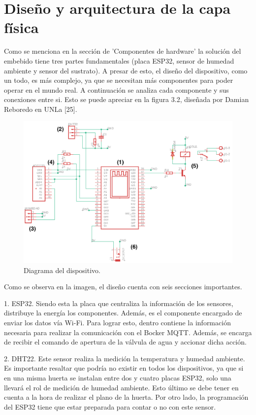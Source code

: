 \section{Diseño y arquitectura de la capa física}
Como se menciona en la sección de 'Componentes de hardware' la solución del embebido tiene tres partes fundamentales (placa ESP32, sensor de humedad ambiente y sensor del sustrato). A presar de esto, el diseño del dispositivo, como un todo, es más complejo, ya que se necesitan más componentes para poder operar en el mundo real. A continuación se analiza cada componente y sus conexiones entre si. Esto se puede apreciar en la figura 3.2, diseñada por Damian Reboredo en UNLa [25].


\begin{figure}[htpb]
\centering 
\includegraphics[width=.9\textwidth]{./Figures/diagDipos.png}
\caption{Diagrama del dispositivo.}
\label{fig:diagBloques}
\end{figure}

Como se observa en la imagen, el diseño cuenta con seis secciones importantes.

1. ESP32. Siendo esta la placa que centraliza la información de los sensores, distribuye la energía los componentes. Además, es el componente encargado de enviar los datos vía Wi-Fi. Para lograr esto, dentro contiene la información necesaria para realizar la comunicación con el Bocker MQTT. Además, se encarga de recibir el comando de apertura de la válvula de agua y accionar dicha acción.

2. DHT22. Este sensor realiza la medición la temperatura y humedad ambiente. Es importante resaltar que podría no existir en todos los dispositivos, ya que si en una misma huerta se instalan entre dos y cuatro placas ESP32, solo una llevará el rol de medición de humedad ambiente. Esto último se debe tener en cuenta a la hora de realizar el plano de la huerta. Por otro lado, la programación del ESP32 tiene que estar preparada para contar o no con este sensor.

